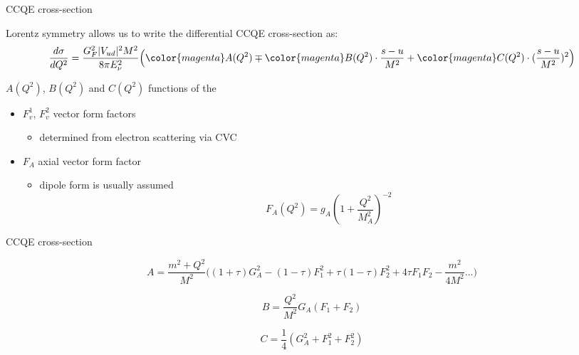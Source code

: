\begin{frame}{CCQE cross-section}

Lorentz symmetry allows us to write the differential CCQE cross-section as:\\

\begin{equation*}
  \frac{d\sigma}{dQ^2} =
     \frac{G_F^2 |V_{ud}|^2 M^2}{8 \pi E_{\nu}^2}
     \Big(
       {\color{magenta} A(Q^2) } \mp
       {\color{magenta} B(Q^2) } \cdot \frac{s-u}{M^2} +
       {\color{magenta} C(Q^2) } \cdot (\frac{s-u}{M^2})^2
     \Big)
\end{equation*}

$A(Q^2)$, $B(Q^2)$ and $C(Q^2)$ functions of the
\begin{itemize}
  \item $F_{v}^{1}$, $F_{v}^{2}$ vector form factors
  \begin{itemize}
    \item determined from electron scattering via CVC
  \end{itemize}
  \item $F_{A}$ axial vector form factor
  \begin{itemize}
    \item dipole form is  usually assumed\\
      \begin{equation*}
         F_{A}(Q^2) = g_{A} (1 + \frac{Q^2}{M_A^{2}})^{-2}
      \end{equation*}
  \end{itemize}
\end{itemize}

\end{frame}

%
%
%

\begin{frame}{CCQE cross-section}

\begin{equation*}
 A = \frac{m^2+Q^2}{M^2}
     \Big(
       (1+\tau) G_A^2 - (1-\tau) F_1^2 + \tau(1-\tau) F_2^2 + 4 \tau F_1 F_2 -
       \frac{m^2}{4M^2} ...
     \Big)
\end{equation*}

\begin{equation*}
 B = \frac{Q^2}{M^2} G_A (F_1 + F_2)
\end{equation*}

\begin{equation*}
 C = \frac{1}{4} (G_A^2 + F_1^2 + F_2^2)
\end{equation*}

\end{frame}


